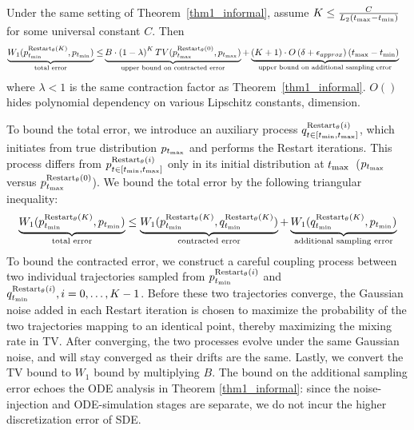 \begin{theorem}[Informal]
\label{thm2_informal}
Under the same setting of Theorem~\ref{thm1_informal}, 
assume $K \leq \frac{C}{L_2 \left( t_{\textrm{max}} - t_{\textrm{min}} \right)}$ for some universal constant $C$. Then
{\footnotesize
\begin{align*}
   \underbrace{W_1(p^{{\textrm{Restart}_\theta}(K)}_{t_{\textrm{min}}}, p_{t_{\textrm{min}}})}_{\textrm{total error}} \leq& \underbrace{B \cdot \left( 1 - \lambda \right)^K TV(p^{{\textrm{Restart}_\theta}(0)}_{t_{\textrm{max}}}, p_{t_{\textrm{max}}})}_{\textrm{upper bound on contracted error}} + \underbrace{(K+1) \cdot O\left( \delta + {\epsilon_{approx}} \right) \left( t_{\textrm{max}} - t_{\textrm{min}} \right)}_{\textrm{upper bound on additional sampling error}}
\end{align*}}
where $\lambda<1$ is the same contraction factor as Theorem~\ref{thm1_informal}. $O()$ hides polynomial dependency on various Lipschitz constants, dimension.
\end{theorem}
\vspace{-6pt}
\begin{proofs}
    To bound the total error, we introduce an auxiliary process {\footnotesize $q^{{\textrm{Restart}_\theta}(i)}_{t \in [t_{\textrm{min}}, t_{\textrm{max}}]}$}, which initiates from true distribution $p_{t_{\textrm{max}}}$ and performs the Restart iterations. This process differs from {\footnotesize ${p}^{{\textrm{Restart}_\theta}(i)}_{t \in [t_{\textrm{min}}, t_{\textrm{max}}]}$} only in its initial distribution at $t_{\textrm{max}}$~($p_{t_{\textrm{max}}}$ versus {\footnotesize $p^{{\textrm{Restart}_\theta}(0)}_{t_{\textrm{max}}}$}). We bound the total error by the following triangular inequality:
    {\footnotesize
    \begin{align*}
        \underbrace{W_1(p^{{\textrm{Restart}_\theta}(K)}_{t_{\textrm{min}}}, p_{t_{\textrm{min}}})}_{\textrm{total error}} \le \underbrace{W_1(p^{{\textrm{Restart}_\theta}(K)}_{t_{\textrm{min}}}, q^{{\textrm{Restart}_\theta}(K)}_{t_{\textrm{min}}})}_{\textrm{contracted error}} + \underbrace{W_1(q^{{\textrm{Restart}_\theta}(K)}_{t_{\textrm{min}}}, p_{t_{\textrm{min}}})}_{\textrm{additional sampling error}}
    \end{align*}}
    To bound the contracted error, we construct a careful coupling process between two individual trajectories sampled from {\footnotesize $p^{{\textrm{Restart}_\theta}(i)}_{t_{\textrm{min}}}$} and {\footnotesize $q^{{\textrm{Restart}_\theta}(i)}_{t_{\textrm{min}}}, i=0, \dots, K-1$}. Before these two trajectories converge, the Gaussian noise added in each Restart iteration is chosen to maximize the probability of the two trajectories mapping to an identical point, thereby maximizing the mixing rate in TV. After converging, the two processes evolve under the same Gaussian noise, and will stay converged as their drifts are the same. Lastly, we convert the TV bound to $W_1$ bound by multiplying $B$. The bound on the additional sampling error echoes the ODE analysis in Theorem \ref{thm1_informal}: since the noise-injection and ODE-simulation stages are separate, we do not incur the higher discretization error of SDE.
    \vspace{-6pt}
\end{proofs}
